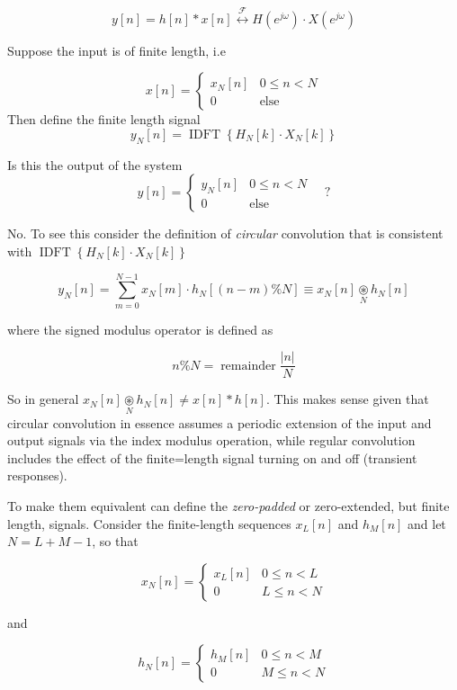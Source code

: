 \documentclass{article}
\begin{document}
\[
y[n] = h[n] * x[n] \stackrel{\mathcal{F}}{\longleftrightarrow} H\left(e^{j\omega}\right)\cdot X\left(e^{j\omega}\right)
\]

Suppose the input is of finite length, i.e

\[
x[n] = \left\{ \begin{array}{cc}
x_N[n] & 0 \leq n < N\\
0 & \text{else}
\end{array}\right.
\]
Then define the finite length signal
\[
y_N[n] = \operatorname{IDFT}\left\{H_N[k]\cdot X_N[k]\right\} 
\]

Is this the output of the system
\[
y[n] = \left\{ \begin{array}{cc}
y_N[n] & 0 \leq n < N\\
0 & \text{else}
\end{array}\right. \quad ?
\]

No. To see this consider the definition of \textit{circular} convolution that is consistent with $\operatorname{IDFT}\left\{H_N[k]\cdot X_N[k]\right\}$

\[
y_N[n] = \sum\limits_{m=0}^{N-1} x_N[m]\cdot h_N[(n-m) \% N] \equiv x_N[n] \underset{N}{\circledast} h_N[n]
\]

where the signed modulus operator is defined as

\[
n \% N = \operatorname{remainder} \frac{|n|}{N}
\]

So in general $x_N[n] \underset{N}{\circledast} h_N[n] \neq x[n] \ast h[n]$. This makes sense given that circular convolution in essence assumes a periodic extension of the input and output signals via the index modulus operation, while regular convolution includes the effect of the finite=length signal turning on and off (transient responses).

To make them equivalent can define the \textit{zero-padded} or zero-extended, but finite length, signals. Consider the finite-length sequences $x_L[n]$ and $h_M[n]$ and let $N = L + M - 1$, so that

\[
x_N[n] = \left\{ \begin{array}{cc}
x_L[n] & 0 \leq n < L\\
0 & L \leq n < N
\end{array}\right.
\]

and

\[
h_N[n] = \left\{ \begin{array}{cc}
h_M[n] & 0 \leq n < M\\
0 & M \leq n < N
\end{array}\right.
\]
\end{document}
